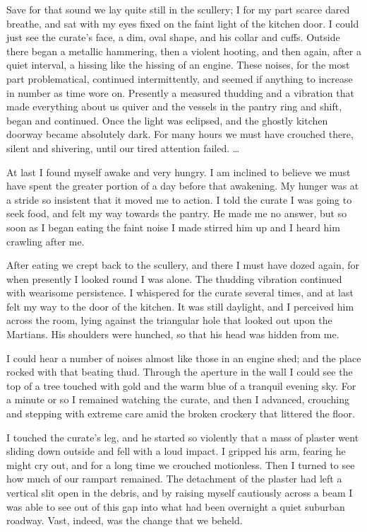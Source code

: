 Save for that sound we lay quite still in the scullery; I for my
part scarce dared breathe, and sat with my eyes fixed on the faint
light of the kitchen door. I could just see the curate's face, a
dim, oval shape, and his collar and cuffs. Outside there began a
metallic hammering, then a violent hooting, and then again, after a
quiet interval, a hissing like the hissing of an engine. These
noises, for the most part problematical, continued intermittently,
and seemed if anything to increase in number as time wore on.
Presently a measured thudding and a vibration that made everything
about us quiver and the vessels in the pantry ring and shift, began
and continued. Once the light was eclipsed, and the ghostly kitchen
doorway became absolutely dark. For many hours we must have
crouched there, silent and shivering, until our tired attention
failed. \ldots{}

At last I found myself awake and very hungry. I am inclined to
believe we must have spent the greater portion of a day before that
awakening. My hunger was at a stride so insistent that it moved me
to action. I told the curate I was going to seek food, and felt my
way towards the pantry. He made me no answer, but so soon as I
began eating the faint noise I made stirred him up and I heard him
crawling after me.

After eating we crept back to the scullery, and there I must have
dozed again, for when presently I looked round I was alone. The
thudding vibration continued with wearisome persistence. I
whispered for the curate several times, and at last felt my way to
the door of the kitchen. It was still daylight, and I perceived him
across the room, lying against the triangular hole that looked out
upon the Martians. His shoulders were hunched, so that his head was
hidden from me.

I could hear a number of noises almost like those in an engine
shed; and the place rocked with that beating thud. Through the
aperture in the wall I could see the top of a tree touched with
gold and the warm blue of a tranquil evening sky. For a minute or
so I remained watching the curate, and then I advanced, crouching
and stepping with extreme care amid the broken crockery that
littered the floor.

I touched the curate's leg, and he started so violently that a mass
of plaster went sliding down outside and fell with a loud impact. I
gripped his arm, fearing he might cry out, and for a long time we
crouched motionless. Then I turned to see how much of our rampart
remained. The detachment of the plaster had left a vertical slit
open in the debris, and by raising myself cautiously across a beam
I was able to see out of this gap into what had been overnight a
quiet suburban roadway. Vast, indeed, was the change that we
beheld.

